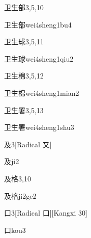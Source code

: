 \begin{entry}{卫生部}{3,5,10}
  \begin{phonetics}{卫生部}{wei4sheng1bu4}
  \end{phonetics}
\end{entry}

\begin{entry}{卫生球}{3,5,11}
  \begin{phonetics}{卫生球}{wei4sheng1qiu2}
  \end{phonetics}
\end{entry}

\begin{entry}{卫生棉}{3,5,12}
  \begin{phonetics}{卫生棉}{wei4sheng1mian2}
  \end{phonetics}
\end{entry}

\begin{entry}{卫生署}{3,5,13}
  \begin{phonetics}{卫生署}{wei4sheng1shu3}
  \end{phonetics}
\end{entry}

\begin{entry}{及}{3}[Radical 又]
  \begin{phonetics}{及}{ji2}
  \end{phonetics}
\end{entry}

\begin{entry}{及格}{3,10}
  \begin{phonetics}{及格}{ji2ge2}
  \end{phonetics}
\end{entry}

\begin{entry}{口}{3}[Radical 口][Kangxi 30]
  \begin{phonetics}{口}{kou3}
  \end{phonetics}
\end{entry}

